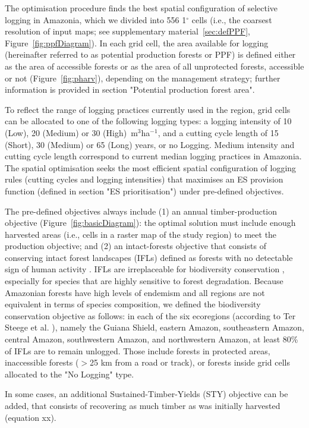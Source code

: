 \documentclass[12pt]{article}
\begin{document}
The optimisation procedure finds the best spatial configuration of selective logging in Amazonia, which we divided into 556 1$^{\circ}$ cells (i.e., the coarsest resolution of input maps; see supplementary material~\ref{sec:defPPF}, Figure~\ref{fig:ppfDiagram}). In each grid cell, the area available for logging (hereinafter referred to as potential production forests or PPF) is defined either as the area of accessible forests or as the area of all unprotected forests, accessible or not (Figure~\ref{fig:pharv}), depending on the management strategy; further information is provided in section "Potential production forest area". 

To reflect the range of logging practices currently used in the region, grid cells can be allocated to one of the following logging types: a logging intensity of 10 (Low), 20 (Medium) or 30 (High)~m$^3$ha$^{−1}$, and a cutting cycle length of 15 (Short), 30 (Medium) or 65 (Long) years, or no Logging. Medium intensity and cutting cycle length correspond to current median logging practices in Amazonia.
The spatial optimisation seeks the most efficient spatial configuration of logging rules (cutting cycles and logging intensities) that maximises an ES provision function (defined in section "ES prioritisation") under pre-defined objectives. 

The pre-defined objectives always include (1) an annual timber-production objective (Figure~\ref{fig:basicDiagram}): the optimal solution must include enough harvested areas (i.e., cells in a raster map of the study region) to meet the production objective; and (2) an intact-forests objective that consists of conserving intact forest landscapes (IFLs) defined as forests with no detectable sign of human activity \cite{Potapov2017}. IFLs are irreplaceable for biodiversity conservation \cite{Gibson2011}, especially for species that are highly sensitive to forest degradation. Because Amazonian forests have high levels of endemism and all regions are not equivalent in terms of species composition, we defined the biodiversity conservation objective as follows: in each of the six ecoregions (according to Ter Steege et al. \cite{TerSteege2013}), namely the Guiana Shield, eastern Amazon, southeastern Amazon, central Amazon, southwestern Amazon, and northwestern Amazon, at least 80\% of IFLs are to remain unlogged. Those include forests in protected areas, inaccessible forests ($>$25 km from a road or track), or forests inside grid cells allocated to the "No Logging" type. 

In some cases, an additional Sustained-Timber-Yields (STY) objective can be added, that consists of recovering as much timber as was initially harvested (equation xx). 
\end{document}
